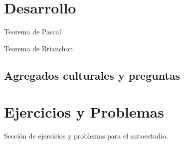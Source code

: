 \section{Desarrollo}



\begin{section-theorem.tcb}{Teorema de Pascal}{}
\end{section-theorem.tcb}

\begin{section-theorem.tcb}{Teorema de Brianchon}{}
\end{section-theorem.tcb}




\subsection{Agregados culturales y preguntas}




\section{Ejercicios y Problemas}

Sección de ejercicios y problemas para el autoestudio.
